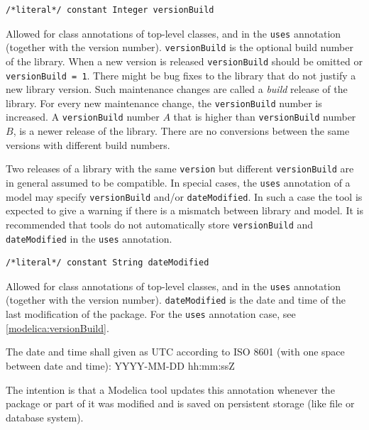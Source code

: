 \begin{annotationdefinition}[versionBuild]
\begin{synopsis}\begin{lstlisting}
/*literal*/ constant Integer versionBuild
\end{lstlisting}\end{synopsis}
\begin{semantics}
Allowed for class annotations of top-level classes, and in the \lstinline!uses! annotation (together with the version number).
\lstinline!versionBuild! is the optional build number of the library.
When a new version is released \lstinline!versionBuild! should be omitted or \lstinline!versionBuild = 1!.
There might be bug fixes to the library that do not justify a new library version.
Such maintenance changes are called a \emph{build} release of the library.
For every new maintenance change, the \lstinline!versionBuild! number is increased.
A \lstinline!versionBuild! number $A$ that is higher than \lstinline!versionBuild! number $B$, is a newer release of the library.
There are no conversions between the same versions with different build numbers.

Two releases of a library with the same \lstinline!version! but different \lstinline!versionBuild! are in general assumed to be compatible.
In special cases, the \lstinline!uses! annotation of a model may specify \lstinline!versionBuild! and/or \lstinline!dateModified!.
In such a case the tool is expected to give a warning if there is a mismatch between library and model.
It is recommended that tools do not automatically store \lstinline!versionBuild! and \lstinline!dateModified! in the \lstinline!uses! annotation.
\end{semantics}
\end{annotationdefinition}

\begin{annotationdefinition}[dateModified]
\begin{synopsis}\begin{lstlisting}
/*literal*/ constant String dateModified
\end{lstlisting}\end{synopsis}
\begin{semantics}
Allowed for class annotations of top-level classes, and in the \lstinline!uses! annotation (together with the version number).
\lstinline!dateModified! is the date and time of the last modification of the package.
For the \lstinline!uses! annotation case, see \cref{modelica:versionBuild}.

The date and time shall given as UTC according to ISO 8601 (with one space between date and time): YYYY-MM-DD hh:mm:ssZ

\begin{nonnormative}
The intention is that a Modelica tool updates this annotation whenever the package or part of it was modified and is saved on persistent storage (like file or database system).
\end{nonnormative}
\end{semantics}
\end{annotationdefinition}

